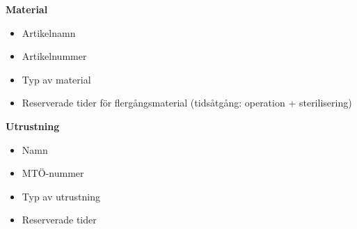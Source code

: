 \textbf{Material}
\begin{itemize}
    \item Artikelnamn
    \item Artikelnummer
    \item Typ av material
    \item Reserverade tider för flergångsmaterial (tidsåtgång: operation + sterilisering)
\end{itemize}

\textbf{Utrustning}
\begin{itemize}
    \item Namn
    \item MTÖ-nummer
    \item Typ av utrustning
    \item Reserverade tider
\end{itemize}
